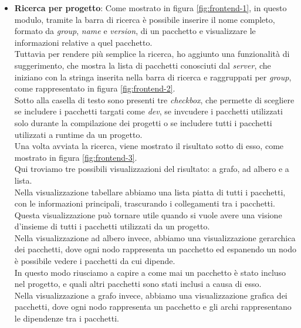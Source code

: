 \begin{itemize}
  \item \textbf{Ricerca per progetto}: Come mostrato in figura \ref*{fig:frontend-1}, in questo modulo, tramite la barra di ricerca
   è possibile inserire il nome completo, formato da \textit{group}, \textit{name} e \textit{version}, di un pacchetto e visualizzare
    le informazioni relative a quel pacchetto.\\
    Tuttavia per rendere più semplice la ricerca, ho aggiunto una funzionalità di suggerimento, che mostra la lista di pacchetti conosciuti dal 
    \textit{server}, che iniziano con la stringa inserita nella barra di ricerca e raggruppati per \textit{group}, come rappresentato in figura \ref*{fig:frontend-2}.\\
    Sotto alla casella di testo sono presenti tre \textit{checkbox}, che permette di scegliere se includere i pacchetti targati come \textit{dev}, 
    se invcudere i pacchetti utilizzati solo durante la compilazione dei progetti o se includere tutti i pacchetti utilizzati a runtime
    da un progetto.\\
    Una volta avviata la ricerca, viene mostrato il risultato sotto di esso, come mostrato in figura \ref*{fig:frontend-3}.\\
    Qui troviamo tre possibili visualizzazioni del risultato: a grafo, ad albero e a lista.\\
    Nella visualizzazione tabellare abbiamo una lista piatta di tutti i pacchetti, con le informazioni principali, trascurando i collegamenti tra i pacchetti.\\
    Questa visualizzazione può tornare utile quando si vuole avere una visione d'insieme di tutti i pacchetti utilizzati da un progetto.\\
    Nella visualizzazione ad albero invece, abbiamo una visualizzazione gerarchica dei pacchetti, dove ogni nodo rappresenta un pacchetto ed espanendo un nodo
    è possibile vedere i pacchetti da cui dipende.\\
    In questo modo riusciamo a capire a come mai un pacchetto è stato incluso nel progetto, e quali altri pacchetti sono stati inclusi a causa di esso.\\
    Nella visualizzazione a grafo invece, abbiamo una visualizzazione grafica dei pacchetti, dove ogni nodo rappresenta un pacchetto e gli archi rappresentano
    le dipendenze tra i pacchetti.\\
    \begin{figure}[h]
      \centering
      \begin{minipage}{0.60\textwidth}

\end{minipage}
\end{figure}
\end{itemize}
